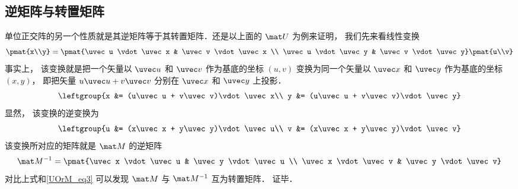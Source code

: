 \subsection{逆矩阵与转置矩阵}
单位正交阵的另一个性质就是其逆矩阵等于其转置矩阵．还是以上面的 $\mat U$ 为例来证明， 我们先来看线性变换
\begin{equation}
\pmat{x\\y} = \pmat{\uvec u \vdot \uvec x & \uvec v \vdot \uvec x \\
\uvec u \vdot \uvec y & \uvec v \vdot \uvec y} \pmat{u\\v}
\end{equation}
事实上， 该变换就是把一个矢量以 $\uvec u$ 和 $\uvec v$ 作为基底的坐标 $(u, v)$ 变换为同一个矢量以 $\uvec x$ 和 $\uvec y$ 作为基底的坐标 $(x, y)$， 即把矢量 $u\uvec u + v\uvec v$ 分别在 $\uvec x$ 和 $\uvec y$ 上投影．
\begin{equation}
\leftgroup{x &= (u\uvec u + v\uvec v)\vdot\uvec x\\
y &= (u\uvec u + v\uvec v)\vdot\uvec y}
\end{equation}
显然， 该变换的逆变换为
\begin{equation}
\leftgroup{u &= (x\uvec x + y\uvec y)\vdot\uvec u\\
v &= (x\uvec x + y\uvec y)\vdot\uvec v}
\end{equation}
该变换所对应的矩阵就是 $\mat M$ 的逆矩阵
\begin{equation}
\mat M^{-1} = \pmat{\uvec x \vdot \uvec u & \uvec y \vdot \uvec u \\
\uvec x \vdot \uvec v & \uvec y \vdot \uvec v}
\end{equation}
对比上式和\autoref{UOrM_eq3} 可以发现 $\mat M$ 与 $\mat M^{-1}$ 互为转置矩阵． 证毕．




